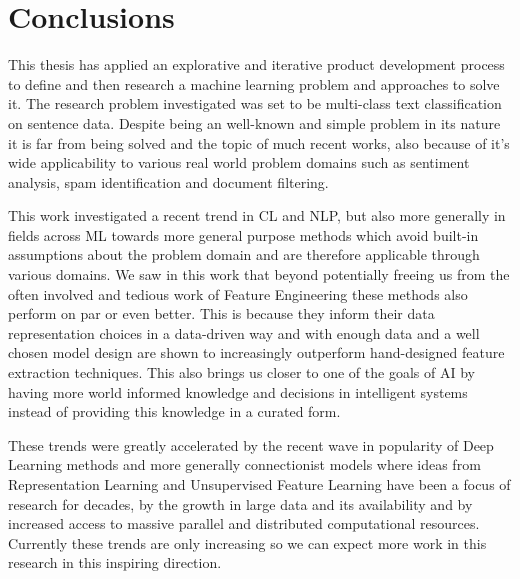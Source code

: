
\clearpage

\section{Conclusions}
\label{sec:Conclusions}

This thesis has applied an explorative and iterative product development process to define and then research a machine learning problem and approaches to solve it. The research problem investigated was set to be multi-class text classification on sentence data. Despite being an well-known and simple problem in its nature it is far from being solved and the topic of much recent works, also because of it's wide applicability to various real world problem domains such as sentiment analysis, spam identification and document filtering.

This work investigated a recent trend in \gls{CL} and \gls{NLP}, but also more generally in fields across \gls{ML} towards more general purpose methods which avoid built-in assumptions about the problem domain and are therefore applicable through various domains. We saw in this work that beyond potentially freeing us from the often involved and tedious work of \gls{Feature Engineering} these methods also perform on par or even better. This is because they inform their data representation choices in a data-driven way and with enough data and a well chosen model design are shown to increasingly outperform hand-designed feature extraction techniques. This also brings us closer to one of the goals of \gls{AI} by having more world informed knowledge and decisions in intelligent systems instead of providing this knowledge in a curated form.

These trends were greatly accelerated by the recent wave in popularity of Deep Learning methods and more generally connectionist models where ideas from \gls{Representation Learning} and Unsupervised Feature Learning have been a focus of research for decades, by the growth in large data and its availability and by increased access to massive parallel and distributed computational resources. Currently these trends are only increasing so we can expect more work in this research in this inspiring direction.



